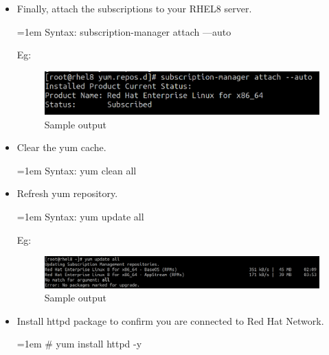\begin{flushleft}
\begin{itemize}
			\newpage
			\item Finally, attach the subscriptions to your RHEL8 server.
			\begin{tcolorbox}[breakable,notitle,boxrule=-0pt,colback=pink,colframe=pink]
				\color{black}
				\font=1em
				Syntax: subscription-manager attach ---auto
				\font=4pt
			\end{tcolorbox}
			Eg:
			\begin{figure}[h!]
				\centering
				\includegraphics[scale=.3]{content/chapter11/images/4.png}
				\caption{Sample output}
				\label{fig:iso7}
			\end{figure}		
			\bigskip
						\bigskip
			\item Clear the yum cache.
			\begin{tcolorbox}[breakable,notitle,boxrule=-0pt,colback=pink,colframe=pink]
				\color{black}
				\font=1em
				Syntax: yum clean all
				\font=4pt
			\end{tcolorbox}		
			\bigskip
						\bigskip
			\item Refresh yum repository.
			\begin{tcolorbox}[breakable,notitle,boxrule=-0pt,colback=pink,colframe=pink]
				\color{black}
				\font=1em
				Syntax: yum update all
				\font=4pt
			\end{tcolorbox}		
			Eg:
			\begin{figure}[h!]
				\centering
				\includegraphics[scale=.25]{content/chapter11/images/update.png}
				\caption{Sample output}
				\label{fig:iso7}
			\end{figure}		
			\bigskip
			\bigskip
			\item Install httpd package to confirm you are connected to Red Hat Network.
			\bigskip
			\begin{tcolorbox}[breakable,notitle,boxrule=-0pt,colback=black,colframe=black]
				\color{white}
				\font=1em
				\color{green}
				\# yum install httpd -y
				\font=4pt
			\end{tcolorbox}
\end{itemize}
	
		
		
	
	
\end{flushleft}

\newpage


